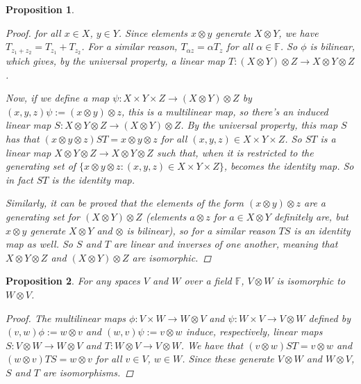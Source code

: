 \documentclass[a4paper,14pt]{article}
\newtheorem*{prop}{Proposition}
\begin{document}
\begin{prop}
\begin{proof}
for all $x \in X$, $y \in Y$. Since elements $x \otimes y$ generate $X \otimes Y$, we have $T_{z_1 + z_2} = T_{z_1} + T_{z_2}$. For a similar reason, $T_{\alpha z} = \alpha T_z$ for all $\alpha \in \mathbb{F}$. So $\phi$ is bilinear, which gives, by the universal property, a linear map $T: (X \otimes Y) \otimes Z \to X \otimes Y \otimes Z$.

\begin{center}
\end{center}

Now, if we define a map $\psi: X \times Y \times Z \to (X \otimes Y) \otimes Z$ by $(x, y, z) \psi := (x \otimes y) \otimes z$, this is a multilinear map, so there's an induced linear map $S: X \otimes Y \otimes Z \to (X \otimes Y) \otimes Z$. By the universal property, this map $S$ has that $(x \otimes y \otimes z) ST = x \otimes y \otimes z$ for all $(x, y, z) \in X \times Y \times Z$. So $ST$ is a linear map $X \otimes Y \otimes Z \to X \otimes Y \otimes Z$ such that, when it is restricted to the generating set of $\{x \otimes y \otimes z : (x, y, z) \in X \times Y \times Z\}$, becomes the identity map. So in fact $ST$ is the identity map.

Similarly, it can be proved that the elements of the form $(x \otimes y) \otimes z$ are a generating set for $(X \otimes Y) \otimes Z$ (elements $a \otimes z$ for $a \in X \otimes Y$ definitely are, but $x \otimes y$ generate $X \otimes Y$ and $\otimes$ is bilinear), so for a similar reason $TS$ is an identity map as well. So $S$ and $T$ are linear and inverses of one another, meaning that $X \otimes Y \otimes Z$ and $(X \otimes Y) \otimes Z$ are isomorphic.
\end{proof}
\end{prop}

\begin{prop}
For any spaces $V$ and $W$ over a field $\mathbb{F}$, $V \otimes W$ is isomorphic to $W \otimes V$.
\begin{proof}
    The multilinear maps $\phi: V \times W \to W \otimes V$ and $\psi: W \times V \to V \otimes W$ defined by $(v, w) \phi := w \otimes v$ and $(w, v) \psi := v \otimes w$ induce, respectively, linear maps $S: V \otimes W \to W \otimes V$ and $T: W \otimes V \to V \otimes W$. We have that $(v \otimes w) ST = v \otimes w$ and $(w \otimes v) TS = w \otimes v$ for all $v \in V$, $w \in W$. Since these generate $V \otimes W$ and $W \otimes V$, $S$ and $T$ are isomorphisms.
\end{proof}
\end{prop}
\end{document}
